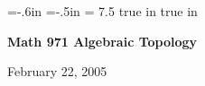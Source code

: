 
\overfullrule=0pt
\parindent=0pt

\nopagenumbers



\voffset=-.6in
\hoffset=-.5in
\hsize = 7.5 true in
 true in




\loadmsbm



\def\ctln{\centerline}
\def\u{\underbar}
\def\ssk{\smallskip}
\def\msk{\medskip}
\def\bsk{\bigskip}
\def\hsk{\hskip.1in}
\def\hhsk{\hskip.2in}
\def\dsl{\displaystyle}
\def\hskp{\hskip1.5in}

\def\lra{$\Leftrightarrow$ }
\def\ra{\rightarrow}
\def\mpto{\logmapsto}
\def\pu{\pi_1}
\def\mpu{$\pi_1$}
\def\sig{\Sigma}
\def\msig{$\Sigma$}
\def\ep{\epsilon}
\def\sset{\subseteq}
\def\del{\partial}
\def\inv{^{-1}}
\def\wtl{\widetilde}
\def\lra{\Leftrightarrow}



\ctln{\bf Math 971 Algebraic Topology}

\ssk

\ctln{February 22, 2005}

\msk

